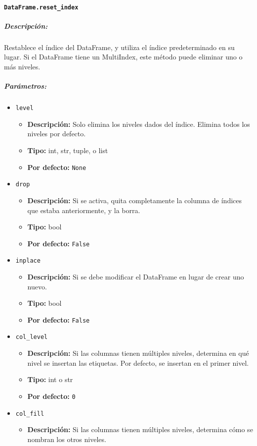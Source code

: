 \paragraph{\texttt{DataFrame.reset\_index}}
\subparagraph{Descripción:}
Restablece el índice del DataFrame, y utiliza el índice predeterminado en su lugar. 
Si el DataFrame tiene un MultiIndex, este método puede eliminar uno o más niveles.
\subparagraph{Parámetros:}
\begin{itemize}
\item \texttt{level}
\begin{itemize}
\item \textbf{Descripción:} Solo elimina los niveles dados del índice. Elimina todos los niveles por defecto.
\item \textbf{Tipo:} int, str, tuple, o list
\item \textbf{Por defecto:} \texttt{None}
\end{itemize}
\item \texttt{drop}
\begin{itemize}
\item \textbf{Descripción:} Si se activa, quita completamente la columna de índices que estaba anteriormente, y la borra.
\item \textbf{Tipo:} bool
\item \textbf{Por defecto:} \texttt{False}
\end{itemize}
\item \texttt{inplace}
\begin{itemize}
\item \textbf{Descripción:} Si se debe modificar el DataFrame en lugar de crear uno nuevo.
\item \textbf{Tipo:} bool
\item \textbf{Por defecto:} \texttt{False}
\end{itemize}
\item \texttt{col\_level}
\begin{itemize}
\item \textbf{Descripción:} Si las columnas tienen múltiples niveles, determina en qué nivel se insertan las etiquetas. Por defecto, se insertan en el primer nivel.
\item \textbf{Tipo:} int o str
\item \textbf{Por defecto:} \texttt{0}
\end{itemize}
\item \texttt{col\_fill}
\begin{itemize}
\item \textbf{Descripción:} Si las columnas tienen múltiples niveles, determina cómo se nombran los otros niveles.

\end{itemize}
\end{itemize}
